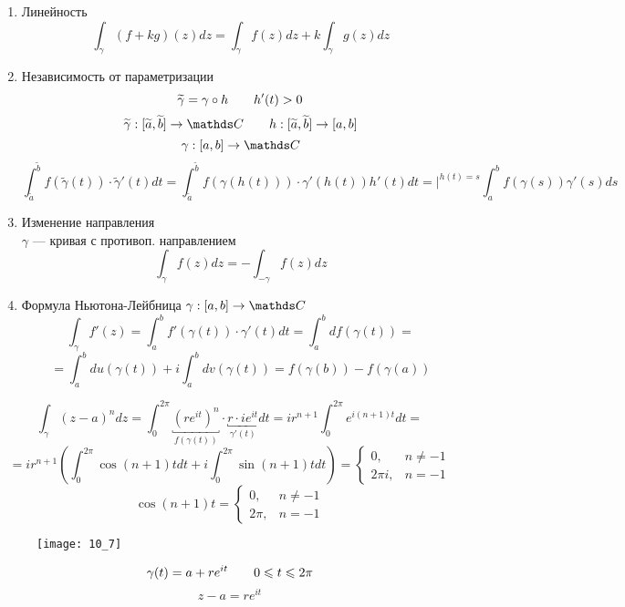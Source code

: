 \documentclass[main]{subfiles}
\begin{document}
    \begin{properties}
        \begin{enumerate}
            \item Линейность
                  \[\int_\gamma (f + kg)(z)dz = \int_\gamma f(z)dz + k\int_\gamma g(z)dz \]
            \item Независимость от параметризации
                  \[\widetilde{\gamma} = \gamma \circ h \qquad h'(t) > 0\]
                  \[\widetilde{\gamma} : [\widetilde{a}, \widetilde{b}] \to \CC \qq h : [\widetilde{a}, \widetilde{b}] \ra [a,b]\]
                  \[\gamma: [a, b] \to \CC\]
                  \[\int_{\widetilde{a}}^{\widetilde{b}} f(
                      \widetilde{\gamma}(t)) \cdot \widetilde{\gamma}'(t)dt =
                      \int_{\widetilde{a}}^{\widetilde{b}} f(\gamma(h(t))) \cdot \gamma'(h(t))
                      h'(t) dt = \bigg|^{h(t) = s}  \int_a^b f(\gamma(s))\gamma'(s)ds\]
            \item Изменение направления \\
                  $\gamma$ --- кривая с противоп. направлением
                  \[\int_\gamma f(z)dz = -\int_{-\gamma} f(z)dz \]
            \item Формула Ньютона-Лейбница \qq $\gamma: [a, b] \to \CC$
                  \[\int_\gamma f'(z) = \int_a^b f'(\gamma(t)) \cdot \gamma'(t)dt =
                      \int_a^b df(\gamma(t)) = \]
                  \[= \int_a^b du(\gamma(t)) + i\int_a^b dv(\gamma(t)) =
                      f(\gamma(b)) - f(\gamma(a))\]
        \end{enumerate}
    \end{properties}

    \begin{Example}[1]
        \[\int_\gamma (z - a)^n dz = \int_0^{2\pi} \underbracket{(re^{it} )^n
            }_{f(\gamma(t))} \cdot \underbracket{r \cdot ie^{it} }_{\gamma'(t)} dt =ir^{n + 1} \int_0^{2\pi}e^{i(n + 1)t}dt =\]
        \[= ir^{n + 1} (\int_0^{2\pi}
            \cos(n + 1)tdt + i\int_0^{2\pi} \sin(n + 1)tdt) = \begin{cases}
                0,      & n \neq -1 \\
                2\pi i, & n = -1
            \end{cases}\]
        \[\cos(n + 1)t = \begin{cases}
                0,    & n \neq -1 \\
                2\pi, & n = -1
            \end{cases}\]
        \begin{figure}[!h]
            \centering
            \texttt{[image: 10\_7]}
        \end{figure}
        \[\gamma(t) = a + re^{it} \qquad 0 \leqslant t \leqslant 2\pi \]
        \[z - a = re^{it} \]
    \end{Example}
\end{document}

